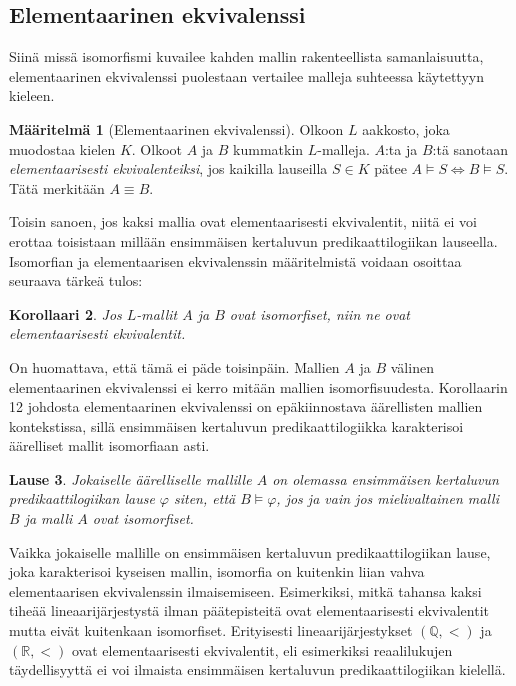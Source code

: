 \documentclass[finnish]{tktltiki2}
\newtheorem{lau}{Lause}
\newtheorem{kor}[lau]{Korollaari}
\theoremstyle{definition}
\newtheorem{maar}[lau]{Määritelmä}
\theoremstyle{remark}
\begin{document}
\subsection{Elementaarinen ekvivalenssi}
Siinä missä isomorfismi kuvailee kahden mallin rakenteellista samanlaisuutta, elementaarinen ekvivalenssi puolestaan vertailee malleja suhteessa käytettyyn kieleen.

\begin{maar}[Elementaarinen ekvivalenssi]
Olkoon $L$ aakkosto, joka muodostaa kielen $K$. Olkoot $A$ ja $B$ kummatkin $L$-malleja. $A$:ta ja $B$:tä sanotaan \textit{elementaarisesti ekvivalenteiksi}, jos kaikilla lauseilla $S \in K$ pätee $A \models S \Longleftrightarrow B \models S$. Tätä merkitään $A \equiv B$.
\end{maar}
Toisin sanoen, jos kaksi mallia ovat elementaarisesti ekvivalentit, niitä ei voi erottaa toisistaan millään ensimmäisen kertaluvun predikaattilogiikan lauseella. Isomorfian ja elementaarisen ekvivalenssin määritelmistä voidaan osoittaa seuraava tärkeä tulos:
\begin{kor}
Jos $L$-mallit $A$ ja $B$ ovat isomorfiset, niin ne ovat elementaarisesti ekvivalentit.
\end{kor}

On huomattava, että tämä ei päde toisinpäin. Mallien $A$ ja $B$ välinen elementaarinen ekvivalenssi ei kerro mitään mallien isomorfisuudesta. Korollaarin 12 johdosta elementaarinen ekvivalenssi on epäkiinnostava äärellisten mallien kontekstissa, sillä ensimmäisen kertaluvun predikaattilogiikka karakterisoi äärelliset mallit isomorfiaan asti.
\begin{lau}
Jokaiselle äärelliselle mallille $A$ on olemassa ensimmäisen kertaluvun predikaattilogiikan lause $\varphi$ siten, että $B \models \varphi$, jos ja vain jos mielivaltainen malli $B$ ja malli $A$ ovat isomorfiset.
\end{lau}

Vaikka jokaiselle mallille on ensimmäisen kertaluvun predikaattilogiikan lause, joka karakterisoi kyseisen mallin, isomorfia on kuitenkin liian vahva elementaarisen ekvivalenssin ilmaisemiseen. Esimerkiksi, mitkä tahansa kaksi tiheää lineaarijärjestystä ilman päätepisteitä ovat elementaarisesti ekvivalentit mutta eivät kuitenkaan isomorfiset. Erityisesti lineaarijärjestykset $(\mathbb{Q}, <)$ ja $(\mathbb{R}, <)$ ovat elementaarisesti ekvivalentit, eli esimerkiksi reaalilukujen täydellisyyttä ei voi ilmaista ensimmäisen kertaluvun predikaattilogiikan kielellä.
\end{document}
